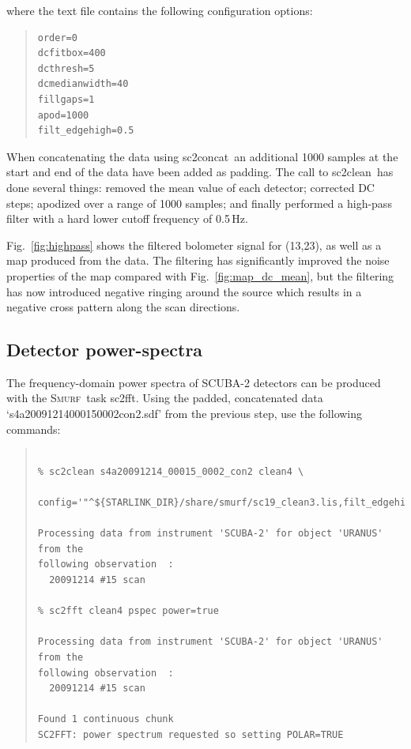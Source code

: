 \documentclass[twoside,11pt]{article}
\newcommand{\xref}[3]{#1}
\newcommand{\xlabel}[1]{}
\renewcommand{\_}{\texttt{\symbol{95}}}
\newenvironment{myquote}{\begin{quote}\begin{small}}{\end{small}\end{quote}}
\newcommand{\smurf}{\xref{\textsc{Smurf}}{sun258}{}}
\newcommand{\task}[1]{\textsf{#1}}
\newcommand{\concat}{\xref{\task{sc2concat}}{sun258}{SC2CONCAT}}
\newcommand{\fft}{\xref{\task{sc2fft}}{sun258}{SC2FFT}}
\newcommand{\clean}{\xref{\task{sc2clean}}{sun258}{SC2CLEAN}}
\begin{document}
where the text file contains the following configuration options:

\begin{myquote}
\begin{verbatim}
order=0
dcfitbox=400
dcthresh=5
dcmedianwidth=40
fillgaps=1
apod=1000
filt_edgehigh=0.5
\end{verbatim}
\end{myquote}

When concatenating the data using \concat\ an additional 1000 samples
at the start and end of the data have been added as padding. The call
to \clean\ has done several things: removed the mean value of each
detector; corrected DC steps; apodized over a range of 1000 samples;
and finally performed a high-pass filter with a hard lower cutoff
frequency of 0.5\,Hz.

Fig.~\ref{fig:highpass} shows the filtered bolometer signal for
(13,23), as well as a map produced from the data. The filtering has
significantly improved the noise properties of the map compared with
Fig.~\ref{fig:map_dc_mean}, but the filtering has now introduced
negative ringing around the source which results in a negative cross
pattern along the scan directions.

\subsection{\xlabel{pspec}Detector power-spectra}

The frequency-domain power spectra of SCUBA-2 detectors can be
produced with the \smurf\ task \fft. Using the padded, concatenated
data `s4a20091214\_00015\_0002\_con2.sdf' from the previous step, use the
following commands:

\begin{myquote}
\begin{verbatim}

% sc2clean s4a20091214_00015_0002_con2 clean4 \
   config='"^${STARLINK_DIR}/share/smurf/sc19_clean3.lis,filt_edgehigh=0"'

Processing data from instrument 'SCUBA-2' for object 'URANUS' from the
following observation  :
  20091214 #15 scan

% sc2fft clean4 pspec power=true

Processing data from instrument 'SCUBA-2' for object 'URANUS' from the
following observation  :
  20091214 #15 scan

Found 1 continuous chunk
SC2FFT: power spectrum requested so setting POLAR=TRUE

\end{verbatim}
\end{myquote}
\end{document}

